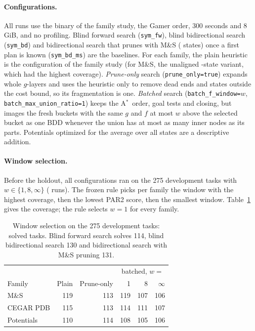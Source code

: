 \documentclass[letterpaper]{article}
\newcommand{\num}[1]{\numprint{#1}}
\newcommand{\astar}{A\ensuremath{^{*}}}
\theoremstyle{plain}
\theoremstyle{definition}
\theoremstyle{remark}
\begin{document}
\paragraph{Configurations.}
All runs use the binary of the family study, the Gamer order, 300 seconds and
8\,GiB, and no profiling.  Blind forward search (\texttt{sym\_fw}), blind
bidirectional search (\texttt{sym\_bd}) and bidirectional search that prunes
with M\&S (\num{10000} states) once a first plan is known
(\texttt{sym\_bd\_ms}) are the baselines.  For each family, the plain
heuristic is the configuration of the family study (for M\&S, the unaligned
\num{10000}-state variant, which had the highest coverage).  \emph{Prune-only}
search (\texttt{prune\_only=true}) expands whole $g$-layers and uses the
heuristic only to remove dead ends and states outside the cost bound, so its
fragmentation is one.  \emph{Batched} search
(\texttt{batch\_f\_window=$w$}, \texttt{batch\_max\_union\_ratio=1}) keeps the
\astar\ order, goal tests and closing, but images the fresh buckets with the
same $g$ and $f$ at most $w$ above the selected bucket as one BDD whenever
the union has at most as many inner nodes as its parts.  Potentials
optimized for the average over all states are a descriptive addition.

\paragraph{Window selection.}
Before the holdout, all configurations ran on the 275 development tasks with
$w\in\{1,8,\infty\}$ (\num{4950} runs).  The frozen rule picks per family the
window with the highest coverage, then the lowest PAR2 score, then the
smallest window.  Table~\ref{tab:supp-remedy-stage1} gives the coverage; the
rule selects $w=1$ for every family.

\begin{table}[tb]
  \centering
  \small
  \begin{tabular}{lrrrrr}
    \toprule
    & & & \multicolumn{3}{c}{batched, $w=$} \\
    Family & Plain & Prune-only & 1 & 8 & $\infty$ \\
    \midrule
    M\&S & 119 & 113 & 119 & 107 & 106 \\
    CEGAR PDB & 115 & 113 & 114 & 111 & 107 \\
    Potentials & 110 & 114 & 108 & 105 & 106 \\
    \bottomrule
  \end{tabular}
  \caption{Window selection on the 275 development tasks: solved tasks.
    Blind forward search solves 114, blind bidirectional search 130 and
    bidirectional search with M\&S pruning 131.}
  \label{tab:supp-remedy-stage1}
\end{table}
\end{document}
